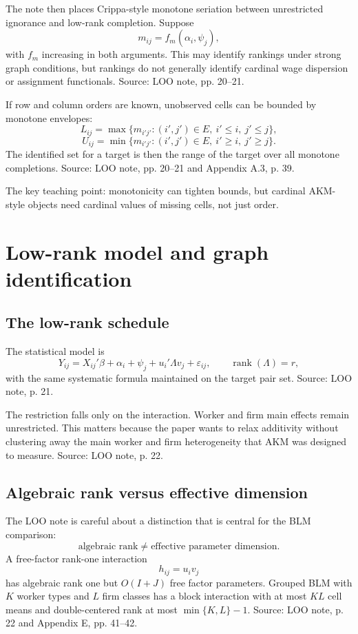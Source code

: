 \documentclass[11pt]{article}
\newcommand{\rank}{\operatorname{rank}}
\begin{document}
The note then places Crippa-style monotone seriation between unrestricted
ignorance and low-rank completion. Suppose
\[
m_{ij}=f_m(\alpha_i,\psi_j),
\]
with \(f_m\) increasing in both arguments. This may identify rankings under
strong graph conditions, but rankings do not generally identify cardinal wage
dispersion or assignment functionals. Source: LOO note, pp. 20--21.

If row and column orders are known, unobserved cells can be bounded by monotone
envelopes:
\[
L_{ij}=\max\{m_{i'j'}:(i',j')\in E,\ i'\leq i,\ j'\leq j\},
\]
\[
U_{ij}=\min\{m_{i'j'}:(i',j')\in E,\ i'\geq i,\ j'\geq j\}.
\]
The identified set for a target is then the range of the target over all
monotone completions. Source: LOO note, pp. 20--21 and Appendix A.3, p. 39.

The key teaching point: monotonicity can tighten bounds, but cardinal AKM-style
objects need cardinal values of missing cells, not just order.

\section{Low-rank model and graph identification}

\subsection{The low-rank schedule}

The statistical model is
\[
Y_{ij}=X_{ij}'\beta+\alpha_i+\psi_j+u_i'\Lambda v_j+\varepsilon_{ij},
\qquad
\rank(\Lambda)=r,
\]
with the same systematic formula maintained on the target pair set. Source:
LOO note, p. 21.

The restriction falls only on the interaction. Worker and firm main effects
remain unrestricted. This matters because the paper wants to relax additivity
without clustering away the main worker and firm heterogeneity that AKM was
designed to measure. Source: LOO note, p. 22.

\subsection{Algebraic rank versus effective dimension}

The LOO note is careful about a distinction that is central for the BLM
comparison:
\[
\text{algebraic rank}\neq\text{effective parameter dimension}.
\]
A free-factor rank-one interaction
\[
h_{ij}=u_i v_j
\]
has algebraic rank one but \(O(I+J)\) free factor parameters. Grouped BLM with
\(K\) worker types and \(L\) firm classes has a block interaction with at most
\(KL\) cell means and double-centered rank at most \(\min\{K,L\}-1\). Source:
LOO note, p. 22 and Appendix E, pp. 41--42.
\end{document}
